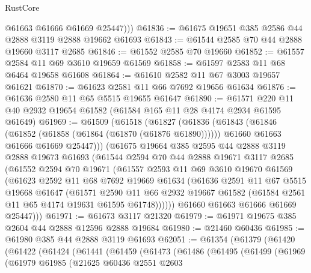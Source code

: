 \begin{lexlean}{RustCore}
\begin{coremodule}
          @61663
          @61666
          @61669
          @25447)))
@61836 := @61675 @19651 @385 @2586 @44 @2888 @3119 @2888 @19662 @61693
@61843 := @61544 @2585 @70 @44 @2888 @19660 @3117 @2685
@61846 := @61552 @2585 @70 @19660
@61852 := @61557 @2584 @11 @69 @3610 @19659 @61569
@61858 := @61597 @2583 @11 @68 @6464 @19658 @61608
@61864 := @61610 @2582 @11 @67 @3003 @19657 @61621
@61870 := @61623 @2581 @11 @66 @7692 @19656 @61634
@61876 := @61636 @2580 @11 @65 @5515 @19655 @61647
@61890 := @61571 @220 @11 @40 @2932 @19654 @61582 (@61584 @165 @11 @28 @4174 @2934 @61595 @61649)
@61969 := @61509
    (@61518
      (@61827
        (@61836
          (@61843
            (@61846 (@61852 (@61858 (@61864 (@61870 (@61876 @61890))))))
            @61660
            @61663
            @61666
            @61669
            @25447)))
      (@61675
        @19664
        @385
        @2595
        @44
        @2888
        @3119
        @2888
        @19673
        @61693
        (@61544
          @2594
          @70
          @44
          @2888
          @19671
          @3117
          @2685
          (@61552
            @2594
            @70
            @19671
            (@61557
              @2593
              @11
              @69
              @3610
              @19670
              @61569
              (@61623
                @2592
                @11
                @68
                @7692
                @19669
                @61634
                (@61636
                  @2591
                  @11
                  @67
                  @5515
                  @19668
                  @61647
                  (@61571
                    @2590
                    @11
                    @66
                    @2932
                    @19667
                    @61582
                    (@61584 @2561 @11 @65 @4174 @19631 @61595 @61748))))))
          @61660
          @61663
          @61666
          @61669
          @25447)))
@61971 := @61673 @3117 @21320
@61979 := @61971 @19675 @385 @2604 @44 @2888 @12596 @2888 @19684
@61980 := @21460 @60436
@61985 := @61980 @385 @44 @2888 @3119 @61693
@62051 := @61354
    (@61379
      (@61420
        (@61422
          (@61424
            (@61441
              (@61459
                (@61473
                  (@61486
                    (@61495
                      (@61499
                        (@61969
                          (@61979
                            @61985
                            (@21625
                              @60436
                              @2551
                              @2603

\end{coremodule}
\end{lexlean}
